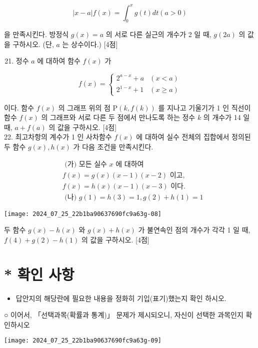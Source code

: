 \documentclass[10pt]{article}
\begin{document}
\[
|x-a| f(x)=\int_{0}^{x} g(t) d t(a>0)
\]

을 만족시킨다. 방정식 $g(x)=a$ 의 서로 다른 실근의 개수가 2 일 때, $g(2 a)$ 의 값을 구하시오. (단, $a$ 는 상수이다.) [4점]

\begin{enumerate}
  \setcounter{enumi}{20}
  \item 정수 $a$ 에 대하여 함수 $f(x)$ 가
\end{enumerate}

\[
f(x)= \begin{cases}2^{a-x}+a & (x<a) \\ 2^{1-x}+1 & (x \geq a)\end{cases}
\]

이다. 함수 $f(x)$ 의 그래프 위의 점 $\mathrm{P}(k, f(k))$ 를 지나고 기울기가 1 인 직선이 함수 $f(x)$ 의 그래프와 서로 다른 두 점에서 만나도록 하는 정수 $k$ 의 개수가 14 일 때, $a+f(a)$ 의 값을 구하시오. [4점]\\
22. 최고차항의 계수가 1 인 사차함수 $f(x)$ 에 대하여 실수 전체의 집합에서 정의된 두 함수 $g(x), h(x)$ 가 다음 조건을 만족시킨다.

\[
\begin{aligned}
& \text { (가) 모든 실수 } x \text { 에 대하여 } \\
& f(x)=g(x)(x-1)(x-2) \text { 이고, } \\
& f(x)=h(x)(x-1)(x-3) \text { 이다. } \\
& \text { (나) } g(1)=h(3)=1, g(2)+h(1)=1
\end{aligned}
\]

\begin{center}
\texttt{[image: 2024\_07\_25\_22b1ba90637690fc9a63g-08]}
\end{center}

두 함수 $g(x)-h(x)$ 와 $g(x)+h(x)$ 가 불연속인 점의 개수가 각각 1 일 때, $f(4)+g(2)-h(1)$ 의 값을 구하시오. [4점]

\section*{* 확인 사항}
\begin{itemize}
  \item 답안지의 해당란에 필요한 내용을 정화히 기입(표기)했는지 확인 하시오.
\end{itemize}

○ 이어서, 「선택과목(확률과 통계)」 문제가 제시되오니, 자신이 선택한 과목인지 확인하시오

\begin{center}
\texttt{[image: 2024\_07\_25\_22b1ba90637690fc9a63g-09]}
\end{center}
\end{document}
